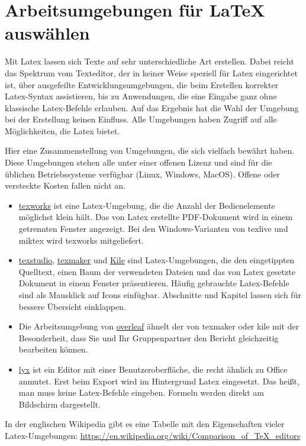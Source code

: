 \documentclass[ngerman]{scrartcl}
\begin{document}
\section{Arbeitsumgebungen für \LaTeX{} auswählen}
Mit Latex lassen sich Texte auf sehr unterschiedliche Art erstellen. Dabei reicht das Spektrum vom Texteditor, der in keiner Weise speziell für Latex eingerichtet ist, über ausgefeilte Entwicklungsumgebungen, die beim Erstellen korrekter Latex-Syntax assistieren, bis zu Anwendungen, die eine Eingabe ganz ohne klassische Latex-Befehle erlauben. Auf das Ergebnis hat die Wahl der Umgebung bei der Erstellung keinen Einfluss. Alle Umgebungen haben Zugriff auf alle Möglichkeiten, die Latex bietet.

Hier eine Zusammenstellung von Umgebungen, die sich vielfach bewährt haben. Diese Umgebungen stehen alle unter einer offenen Lizenz und sind für die üblichen Betriebssysteme verfügbar (Linux, Windows, MacOS). Offene oder versteckte Kosten fallen nicht an.
\begin{itemize}
	\item \href{http://www.tug.org/texworks/}{texworks} ist eine Latex-Umgebung, die die Anzahl der Bedienelemente möglichst klein hält. Das von Latex erstellte PDF-Dokument wird in einem getrennten Fenster angezeigt. Bei den Windows-Varianten von texlive und miktex wird texworks mitgeliefert.
	\item \href{https://www.texstudio.org/}{texstudio}, \href{https://www.xm1math.net/texmaker/}{texmaker} und \href{https://kile.sourceforge.io/}{Kile} sind Latex-Umgebungen, die den eingetippten Quelltext, einen Baum der verwendeten Dateien und das von Latex gesetzte Dokument in einem Fenster präsentieren. Häufig gebrauchte Latex-Befehle sind als Mausklick auf Icons einfügbar. Abschnitte und Kapitel lassen sich für bessere Übersicht \glqq einklappen\grqq.
	\item Die Arbeitsumgebung von \href{https://tex.cloud.uni-hannover.de}{overleaf} ähnelt der von texmaker oder kile mit der Besonderheit, dass Sie und Ihr Gruppenpartner den Bericht gleichzeitig bearbeiten können.
	\item \href{https://www.lyx.org/}{lyx} ist ein Editor mit einer Benutzeroberfläche, die recht ähnlich zu Office anmutet. Erst beim Export wird im Hintergrund Latex eingesetzt. Das heißt, man muss keine Latex-Befehle eingeben. Formeln werden direkt am Bildschirm dargestellt.
\end{itemize}
In der englischen Wikipedia gibt es eine Tabelle mit den Eigenschaften vieler Latex-Umgebungen:
\url{https://en.wikipedia.org/wiki/Comparison_of_TeX_editors}
\end{document}
